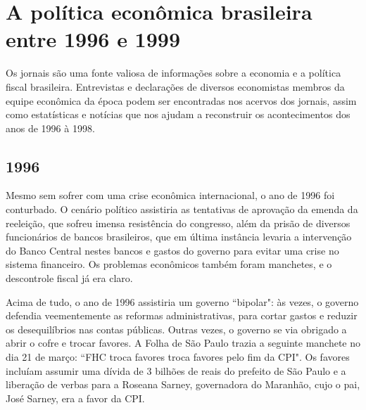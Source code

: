 \documentclass{article}
\begin{document}

\section{A política econômica brasileira entre 1996 e 1999}

Os jornais são uma fonte valiosa de informações sobre a economia e a política fiscal brasileira. Entrevistas e declarações de diversos economistas membros da equipe econômica da época podem ser encontradas nos acervos dos jornais, assim como estatísticas e notícias que nos ajudam a reconstruir os acontecimentos dos anos de 1996 à 1998. 

\subsection*{1996}

Mesmo sem sofrer com uma crise econômica internacional, o ano de 1996 foi conturbado. O cenário político assistiria as tentativas de aprovação da emenda da reeleição, que sofreu imensa resistência do congresso, além da prisão de diversos funcionários de bancos brasileiros, que em última instância levaria a intervenção do Banco Central nestes bancos e gastos do governo para evitar uma crise no sistema financeiro. Os problemas econômicos também foram manchetes, e o descontrole fiscal já era claro.

Acima de tudo, o ano de 1996 assistiria um governo ``bipolar": às vezes, o governo defendia veementemente as reformas administrativas, para cortar gastos e reduzir os desequilíbrios nas contas públicas. Outras vezes, o governo se via obrigado a abrir o cofre e trocar favores. A Folha de São Paulo trazia a seguinte manchete no dia 21 de março: ``FHC troca favores troca favores pelo fim da CPI".  Os favores incluíam assumir uma dívida de 3 bilhões de reais do prefeito de São Paulo e a liberação de verbas para a Roseana Sarney, governadora do Maranhão, cujo o pai, José Sarney, era a favor da CPI. %
\end{document}
